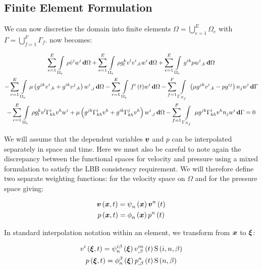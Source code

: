 \subsection{Finite Element Formulation}

We can now discretise the domain into finite elements \ie
$\Omega=\displaystyle{\bigcup_{e=1}^{E}}\Omega_{e}$ with
$\Gamma=\displaystyle{\bigcup_{f=1}^{F}}\Gamma_{f}$.  now
becomes:

\begin{multline}
  \gsum{e=1}{E}{\gint{\Omega_{e}}{}{\rho\dot{v}^{i}w^{i}}{\Omega}}
 +\gsum{e=1}{E}{\gint{\Omega_{e}}{}{{\rho}g^{k}_{l}{v^{l}}\partialderiv{v^{i}}{k}{w^{i}}}{\Omega}}
 +\gsum{e=1}{E}{\gint{\Omega_{e}}{}{g^{ik}{p}\partialderiv{w^{i}}{k}}{\Omega}}\\
 -\gsum{e=1}{E}{\gint{\Omega_{e}}{}{\mu\pbrac{g^{jk}\partialderiv{v^{i}}{k}+g^{ik}\partialderiv{v^{j}}{k}}\partialderiv{w^{i}}{j}}{\Omega}}
 -\gsum{e=1}{E}{\gint{\Omega_{e}}{}{{\fnof{f^{i}}{t}}{w^{i}}}{\Omega}}
 -\gsum{f=1}{F}{\gint{\Gamma_{N_{f}}}{}{\pbrac{\mu g^{jk}\partialderiv{v^{i}}{k}-pg^{ij}}n_{j}w^{i}}{\Gamma}}\\
 -\gsum{e=1}{E}{\gint{\Omega_{e}}{}{\rho
   g^{k}_{l}v^{l}\christoffel{i}{k}{h}v^{h}w^{i}+\mu\pbrac{g^{jk}\christoffel{i}{k}{h}v^{h}+
     g^{ik}\christoffel{j}{k}{h}v^{h}}\partialderiv{w^{i}}{j}}{\Omega}}
 -\gsum{f=1}{F}{\gint{\Gamma_{N_{f}}}{}{\mu g^{jk}\christoffel{i}{k}{h}v^{h}n_{j}w^{i}}{\Gamma}}=0
 \label{eqn:FEMNSE}
\end{multline}

We will assume that the dependent variables $\vectr{v}$ and $p$ can be
interpolated separately in space and time. Here we must also be careful to
note again the discrepancy between the functional spaces for velocity and
pressure using a mixed formulation to satisfy the LBB consistency
requirement. We will therefore define two separate weighting functions: for
the velocity space on $\Omega$ and for the pressure space giving:

\begin{gather}
  \fnof{\vectr{v}}{\vectr{x},t}=\gbfn{n}{}{\vectr{x}}\fnof{\nodept{\vectr{v}}{n}}{t}\\
  \fnof{p}{\vectr{x},t}=\altgbfn{n}{}{\vectr{x}}\fnof{\nodept{p}{n}}{t}
\end{gather}

In standard interpolation notation within an element, we transform from
$\vectr{x}$ to $\vectr{\xi}$:

\begin{gather}
  \fnof{v^{i}}{\vectr{\xi},t}=\idxgbfn{i}{n}{\beta}{\vectr{\xi}}
  \fnof{\idxnodedof{v}{i}{n}{\beta}}{t}\idxgsf{i}{n}{\beta}\\
  \fnof{p}{\vectr{\xi},t}=\altgbfn{n}{\beta}{\vectr{\xi}}
  \fnof{\nodedof{p}{n}{\beta}}{t}\gsf{n}{\beta}
\end{gather}


